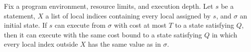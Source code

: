 \begin{theorem}
\label{Light.Ends.keepingBut}
\leanok
{}
Fix a program environment, resource limits, and execution depth. Let $s$ be a statement,
$X$ a list of local indices containing every local assigned by $s$, and $\sigma$ an
initial state. If $s$ can execute from $\sigma$ with cost at most $T$ to a state
satisfying $Q$, then it can execute with the same cost bound to a state satisfying $Q$
in which every local index outside $X$ has the same value as in $\sigma$.
\end{theorem}
